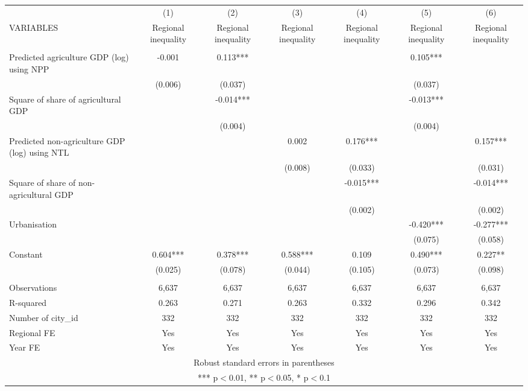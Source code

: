 \documentclass[]{article}
\begin{document}
\begin{tabular}{lcccccc} \hline
 & (1) & (2) & (3) & (4) & (5) & (6) \\
VARIABLES & Regional inequality & Regional inequality & Regional inequality & Regional inequality & Regional inequality & Regional inequality \\ \hline
 &  &  &  &  &  &  \\
Predicted agriculture GDP (log) using NPP & -0.001 & 0.113*** &  &  & 0.105*** &  \\
 & (0.006) & (0.037) &  &  & (0.037) &  \\
Square of share of agricultural GDP &  & -0.014*** &  &  & -0.013*** &  \\
 &  & (0.004) &  &  & (0.004) &  \\
Predicted non-agriculture GDP (log) using NTL &  &  & 0.002 & 0.176*** &  & 0.157*** \\
 &  &  & (0.008) & (0.033) &  & (0.031) \\
Square of share of non-agricultural GDP &  &  &  & -0.015*** &  & -0.014*** \\
 &  &  &  & (0.002) &  & (0.002) \\
Urbanisation &  &  &  &  & -0.420*** & -0.277*** \\
 &  &  &  &  & (0.075) & (0.058) \\
Constant & 0.604*** & 0.378*** & 0.588*** & 0.109 & 0.490*** & 0.227** \\
 & (0.025) & (0.078) & (0.044) & (0.105) & (0.073) & (0.098) \\
 &  &  &  &  &  &  \\
Observations & 6,637 & 6,637 & 6,637 & 6,637 & 6,637 & 6,637 \\
R-squared & 0.263 & 0.271 & 0.263 & 0.332 & 0.296 & 0.342 \\
Number of city\_id & 332 & 332 & 332 & 332 & 332 & 332 \\
Regional FE & Yes & Yes & Yes & Yes & Yes & Yes \\
 Year FE & Yes & Yes & Yes & Yes & Yes & Yes \\ \hline
\multicolumn{7}{c}{ Robust standard errors in parentheses} \\
\multicolumn{7}{c}{ *** p$<$0.01, ** p$<$0.05, * p$<$0.1} \\
\end{tabular}
\end{document}
